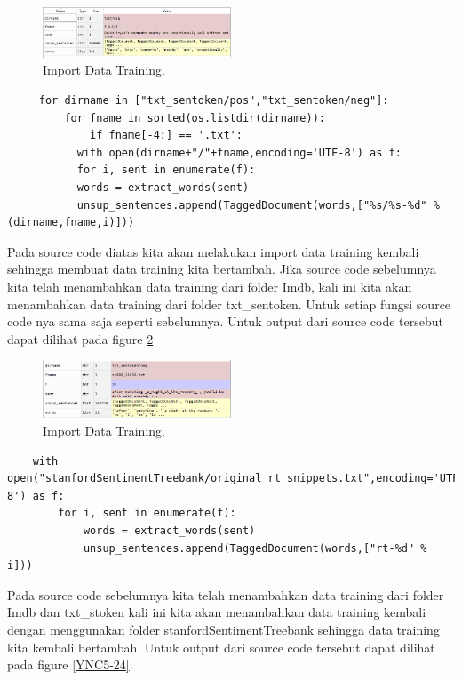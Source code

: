\begin{enumerate}
	\begin{figure}[!htbp]
		\centerline{\includegraphics[width=0.5\textwidth]{figures/YN/Chapter5/Praktek/YNC5-22.jpeg}}
		\caption{Import Data Training.}
		\label{YNC5-22}
	\end{figure}

	\begin{verbatim}
	 for dirname in ["txt_sentoken/pos","txt_sentoken/neg"]:
    	 for fname in sorted(os.listdir(dirname)):
        	 if fname[-4:] == '.txt':
           with open(dirname+"/"+fname,encoding='UTF-8') as f:
           for i, sent in enumerate(f):
           words = extract_words(sent)
           unsup_sentences.append(TaggedDocument(words,["%s/%s-%d" % (dirname,fname,i)]))
	\end{verbatim}

	\subitem Pada source code diatas kita akan melakukan import data training kembali sehingga membuat data training kita bertambah. Jika source code sebelumnya kita telah menambahkan data training dari folder Imdb, kali ini kita akan menambahkan data training dari folder txt\_sentoken. Untuk setiap fungsi source code nya sama saja seperti sebelumnya. Untuk output dari source code tersebut dapat dilihat pada figure \ref{YNC5-23}

	\begin{figure}[!htbp]
		\centerline{\includegraphics[width=0.5\textwidth]{figures/YN/Chapter5/Praktek/YNC5-23.PNG}}
		\caption{Import Data Training.}
		\label{YNC5-23}
	\end{figure}

	\begin{verbatim}
	with open("stanfordSentimentTreebank/original_rt_snippets.txt",encoding='UTF-8') as f:
    	for i, sent in enumerate(f):
        	words = extract_words(sent)
        	unsup_sentences.append(TaggedDocument(words,["rt-%d" % i]))
	\end{verbatim}

	\subitem Pada source code sebelumnya kita telah menambahkan data training dari folder Imdb dan txt\_stoken kali ini kita akan menambahkan data training kembali dengan menggunakan folder stanfordSentimentTreebank sehingga data training kita kembali bertambah. Untuk output dari source code tersebut dapat dilihat pada figure \ref{YNC5-24}.


\end{enumerate}
